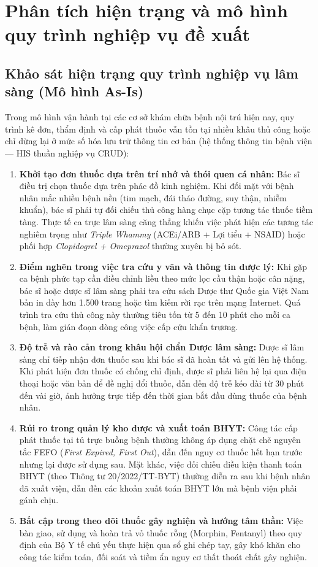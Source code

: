 \section{Phân tích hiện trạng và mô hình quy trình nghiệp vụ đề xuất}
\label{sec:proposed_workflow}

\subsection{Khảo sát hiện trạng quy trình nghiệp vụ lâm sàng (Mô hình As-Is)}
\label{subsec:as_is_workflow}

Trong mô hình vận hành tại các cơ sở khám chữa bệnh nội trú hiện nay, quy trình kê đơn, thẩm định và cấp phát thuốc vẫn tồn tại nhiều khâu thủ công hoặc chỉ dừng lại ở mức số hóa lưu trữ thông tin cơ bản (hệ thống thông tin bệnh viện --- HIS thuần nghiệp vụ CRUD):

\begin{enumerate}[leftmargin=1.8em]
    \item \textbf{Khởi tạo đơn thuốc dựa trên trí nhớ và thói quen cá nhân:} Bác sĩ điều trị chọn thuốc dựa trên phác đồ kinh nghiệm. Khi đối mặt với bệnh nhân mắc nhiều bệnh nền (tim mạch, đái tháo đường, suy thận, nhiễm khuẩn), bác sĩ phải tự đối chiếu thủ công hàng chục cặp tương tác thuốc tiềm tàng. Thực tế ca trực lâm sàng căng thẳng khiến việc phát hiện các tương tác nghiêm trọng như \textit{Triple Whammy} (ACEi/ARB + Lợi tiểu + NSAID) hoặc phối hợp \textit{Clopidogrel + Omeprazol} thường xuyên bị bỏ sót.
    \item \textbf{Điểm nghẽn trong việc tra cứu y văn và thông tin dược lý:} Khi gặp ca bệnh phức tạp cần điều chỉnh liều theo mức lọc cầu thận hoặc cân nặng, bác sĩ hoặc dược sĩ lâm sàng phải tra cứu sách Dược thư Quốc gia Việt Nam bản in dày hơn 1.500 trang hoặc tìm kiếm rời rạc trên mạng Internet. Quá trình tra cứu thủ công này thường tiêu tốn từ 5 đến 10 phút cho mỗi ca bệnh, làm gián đoạn dòng công việc cấp cứu khẩn trương.
    \item \textbf{Độ trễ và rào cản trong khâu hội chẩn Dược lâm sàng:} Dược sĩ lâm sàng chỉ tiếp nhận đơn thuốc sau khi bác sĩ đã hoàn tất và gửi lên hệ thống. Khi phát hiện đơn thuốc có chống chỉ định, dược sĩ phải liên hệ lại qua điện thoại hoặc văn bản để đề nghị đổi thuốc, dẫn đến độ trễ kéo dài từ 30 phút đến vài giờ, ảnh hưởng trực tiếp đến thời gian bắt đầu dùng thuốc của bệnh nhân.
    \item \textbf{Rủi ro trong quản lý kho dược và xuất toán BHYT:} Công tác cấp phát thuốc tại tủ trực buồng bệnh thường không áp dụng chặt chẽ nguyên tắc FEFO (\textit{First Expired, First Out}), dẫn đến nguy cơ thuốc hết hạn trước nhưng lại được sử dụng sau. Mặt khác, việc đối chiếu điều kiện thanh toán BHYT (theo Thông tư 20/2022/TT-BYT) thường diễn ra sau khi bệnh nhân đã xuất viện, dẫn đến các khoản xuất toán BHYT lớn mà bệnh viện phải gánh chịu.
    \item \textbf{Bất cập trong theo dõi thuốc gây nghiện và hướng tâm thần:} Việc bàn giao, sử dụng và hoàn trả vỏ thuốc rỗng (Morphin, Fentanyl) theo quy định của Bộ Y tế chủ yếu thực hiện qua sổ ghi chép tay, gây khó khăn cho công tác kiểm toán, đối soát và tiềm ẩn nguy cơ thất thoát chất gây nghiện.
\end{enumerate}

